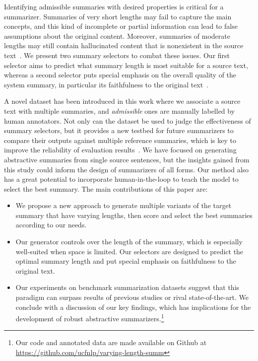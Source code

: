 \documentclass[11pt]{article}
\begin{document}
Identifying admissible summaries with desired properties is critical for a summarizer.
Summaries of very short lengths may fail to capture the main concepts, and this kind of incomplete or partial information can lead to false assumptions about the original content.
Moreover, summaries of moderate lengths may still contain hallucinated content that is nonexistent in the source text~\cite{maynez-etal-2020-faithfulness}.
We present two summary selectors to combat these issues.
Our first selector aims to predict what summary length is most suitable for a source text,
whereas a second selector puts special emphasis on the overall quality of the system summary, in particular its faithfulness to the original text~\cite{falke-etal-2019-ranking,durmus-etal-2020-feqa}.


A novel dataset has been introduced in this work where we associate a source text with multiple summaries, and \emph{admissible} ones are manually labelled by human annotators.
Not only can the dataset be used to judge the effectiveness of summary selectors, 
but it provides a new testbed for future summarizers to compare their outputs against multiple reference summaries, which is key to improve the reliability of evaluation results~\cite{louis-nenkova-2013-automatically}.
We have focused on generating abstractive summaries from single source sentences, but the insights gained from this study could inform the design of summarizers of all forms.
Our method also has a great potential to incorporate human-in-the-loop to teach the model to select the best summary.
The main contributions of this paper are:
\begin{itemize}[topsep=3pt,itemsep=-1pt,leftmargin=*]

    \item We propose a new approach to generate multiple variants of the target summary that have varying lengths, then score and select the best summaries according to our needs.
    
    \item Our generator controls over the length of the summary, which is especially well-suited when space is limited. Our selectors are designed to predict the optimal summary length and put special emphasis on faithfulness to the original text.
    
    \item Our experiments on benchmark summarization datasets suggest that this paradigm can surpass results of previous studies or rival state-of-the-art. We conclude with a discussion of our key findings, which has implications for the development of robust abstractive summarizers.\footnote{Our code and annotated data are made available on Github at \url{https://github.com/ucfnlp/varying-length-summ}}
    
\end{itemize}
\end{document}
